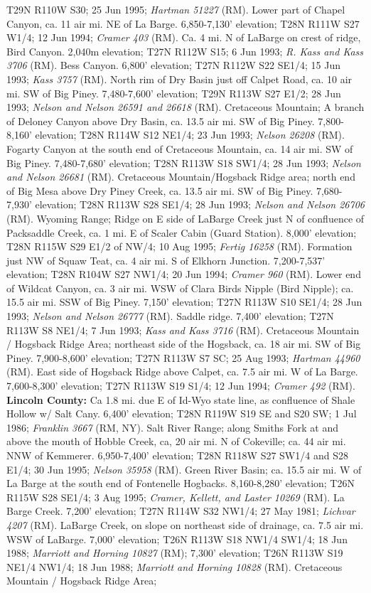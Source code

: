 T29N R110W S30; 25 Jun 1995; \textit{Hartman 51227} (RM).  Lower part of Chapel Canyon, ca. 11 air mi. NE of La Barge. 6,850-7,130’ elevation; T28N R111W S27 W1/4; 12 Jun 1994; \textit{Cramer 403} (RM).  Ca. 4 mi. N of LaBarge on crest of ridge, Bird Canyon. 2,040m elevation; T27N R112W S15; 6 Jun 1993; \textit{R. Kass and Kass 3706} (RM).  Bess Canyon. 6,800’ elevation; T27N R112W S22 SE1/4; 15 Jun 1993; \textit{Kass 3757} (RM).  North rim of Dry Basin just off Calpet Road, ca. 10 air mi. SW of Big Piney. 7,480-7,600’ elevation; T29N R113W S27 E1/2; 28 Jun 1993; \textit{Nelson and Nelson 26591 and 26618} (RM).  Cretaceous Mountain; A branch of Deloney Canyon above Dry Basin, ca. 13.5 air mi. SW of Big Piney. 7,800-8,160’ elevation; T28N R114W S12 NE1/4; 23 Jun 1993; \textit{Nelson 26208} (RM). Fogarty Canyon at the south end of Cretaceous Mountain, ca. 14 air mi. SW of Big Piney. 7,480-7,680’ elevation; T28N R113W S18 SW1/4; 28 Jun 1993; \textit{Nelson and Nelson 26681} (RM).  Cretaceous Mountain/Hogsback Ridge area; north end of Big Mesa above Dry Piney Creek, ca. 13.5 air mi. SW of Big Piney.	7,680-7,930' elevation; T28N R113W S28	SE1/4; 28 Jun 1993; \textit{Nelson and Nelson 26706} (RM).  Wyoming Range; Ridge on E side of LaBarge Creek just N of confluence of Packsaddle Creek, ca. 1 mi. E of Scaler Cabin (Guard Station). 8,000’ elevation; T28N R115W S29 E1/2 of NW/4; 10 Aug 1995; \textit{Fertig 16258} (RM).  Formation just NW of Squaw Teat, ca. 4 air mi. S of Elkhorn Junction. 7,200-7,537' elevation; T28N R104W S27 NW1/4; 20 Jun 1994; \textit{Cramer 960} (RM).  Lower end of Wildcat Canyon, ca. 3 air mi. WSW of Clara Birds Nipple (Bird Nipple); ca. 15.5 air mi. SSW of Big Piney. 7,150’ elevation; T27N R113W S10 SE1/4; 28 Jun 1993; \textit{Nelson and Nelson 26777} (RM).  Saddle ridge. 7,400’ elevation; T27N R113W S8 NE1/4; 7 Jun 1993; \textit{Kass and Kass 3716} (RM).  Cretaceous Mountain / Hogsback Ridge Area; northeast side of the Hogsback, ca. 18 air mi. SW of Big Piney. 7,900-8,600’ elevation; T27N R113W S7 SC; 25 Aug 1993; \textit{Hartman 44960} (RM).  East side of Hogsback Ridge above Calpet, ca. 7.5 air mi. W of La Barge. 7,600-8,300’ elevation; T27N R113W S19 S1/4; 12 Jun 1994; \textit{Cramer 492} (RM).  \textbf{Lincoln County:} Ca 1.8 mi. due E of Id-Wyo state line, as confluence of Shale Hollow w/ Salt Cany. 6,400' elevation; T28N R119W S19 SE and S20 SW; 1 Jul 1986; \textit{Franklin 3667} (RM, NY).  Salt River Range; along Smiths Fork at and above the mouth of Hobble Creek, ca, 20 air mi. N of Cokeville; ca. 44 air mi. NNW of Kemmerer. 6,950-7,400' elevation; T28N R118W S27	SW1/4 and S28 E1/4; 30 Jun 1995; \textit{Nelson 35958} (RM).  Green River Basin; ca. 15.5 air mi. W of La Barge at the south end of Fontenelle Hogbacks. 8,160-8,280' elevation; T26N R115W S28	SE1/4; 3 Aug 1995; \textit{Cramer, Kellett, and Laster 10269} (RM).  La Barge Creek. 7,200' elevation; T27N R114W S32	NW1/4; 27 May 1981; \textit{Lichvar 4207} (RM).  LaBarge Creek, on slope on northeast side of drainage, ca. 7.5 air mi. WSW of LaBarge. 7,000’ elevation; T26N R113W S18 NW1/4 SW1/4; 18 Jun 1988; \textit{Marriott and Horning 10827} (RM); 7,300’ elevation; T26N R113W S19 NE1/4 NW1/4; 18 Jun 1988; \textit{Marriott and Horning 10828} (RM).  Cretaceous Mountain / Hogsback Ridge Area; 